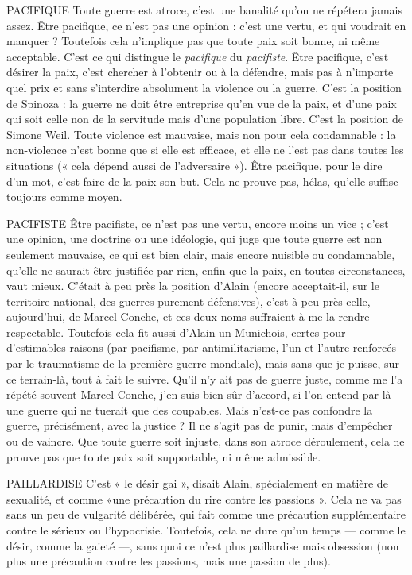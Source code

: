PACIFIQUE Toute guerre est atroce, c’est une banalité qu’on ne répétera
jamais assez. Être pacifique, ce n’est pas une opinion : c’est une
vertu, et qui voudrait en manquer ? Toutefois cela n’implique pas que toute
paix soit bonne, ni même acceptable. C’est ce qui distingue le {\it pacifique} du {\it pacifiste}.
Être pacifique, c’est désirer la paix, c’est chercher à l'obtenir ou à la
défendre, mais pas à n’importe quel prix et sans s’interdire absolument la violence
ou la guerre. C’est la position de Spinoza : la guerre ne doit être entreprise
qu’en vue de la paix, et d’une paix qui soit celle non de la servitude mais
d’une population libre. C’est la position de Simone Weil. Toute violence est
mauvaise, mais non pour cela condamnable : la non-violence n’est bonne que
si elle est efficace, et elle ne l’est pas dans toutes les situations (« cela dépend
aussi de l’adversaire »). Être pacifique, pour le dire d’un mot, c’est faire de la
paix son but. Cela ne prouve pas, hélas, qu’elle suffise toujours comme moyen.

PACIFISTE Être pacifiste, ce n’est pas une vertu, encore moins un vice ; c’est
une opinion, une doctrine ou une idéologie, qui juge que toute
guerre est non seulement mauvaise, ce qui est bien clair, mais encore nuisible
ou condamnable, qu’elle ne saurait être justifiée par rien, enfin que la paix, en
toutes circonstances, vaut mieux. C’était à peu près la position d’Alain (encore
acceptait-il, sur le territoire national, des guerres purement défensives), c’est à
peu près celle, aujourd’hui, de Marcel Conche, et ces deux noms suffraient à
me la rendre respectable. Toutefois cela fit aussi d’Alain un Munichois, certes
pour d’estimables raisons (par pacifisme, par antimilitarisme, l’un et l’autre
renforcés par le traumatisme de la première guerre mondiale), mais sans que je
puisse, sur ce terrain-là, tout à fait le suivre. Qu'il n’y ait pas de guerre juste,
comme me l’a répété souvent Marcel Conche, j’en suis bien sûr d’accord, si
l’on entend par là une guerre qui ne tuerait que des coupables. Mais n’est-ce
pas confondre la guerre, précisément, avec la justice ? Il ne s’agit pas de punir,
mais d'empêcher ou de vaincre. Que toute guerre soit injuste, dans son atroce
déroulement, cela ne prouve pas que toute paix soit supportable, ni même
admissible.

PAILLARDISE C'est « le désir gai », disait Alain, spécialement en matière de
sexualité, et comme «une précaution du rire contre les
passions ». Cela ne va pas sans un peu de vulgarité délibérée, qui fait comme
une précaution supplémentaire contre le sérieux ou l’hypocrisie. Toutefois, cela
ne dure qu’un temps — comme le désir, comme la gaieté —, sans quoi ce n’est
plus paillardise mais obsession (non plus une précaution contre les passions,
mais une passion de plus).

